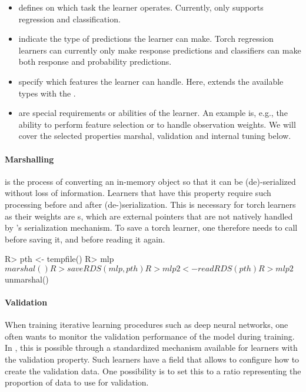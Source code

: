 \documentclass[article]{jss}
\theoremstyle{definition}
\begin{document}
\begin{itemize}
    \item {} defines on which task the learner operates. Currently,  only supports regression and classification.
    \item {} indicate the type of predictions the learner can make. Torch regression learners can currently only make response predictions and classifiers can make both response and probability predictions.
    \item {} specify which features the learner can handle. Here, \mlrttorch{} extends the available types with the .
    \item {} are special requirements or abilities of the learner. An example is, e.g., the ability to perform feature selection or to handle observation weights. We will cover the selected properties marshal, validation and internal tuning below.
\end{itemize}


\paragraph{Marshalling} is the process of converting an in-memory object so that it can be (de)-serialized without loss of information.
Learners that have this property require such processing before and after (de-)serialization.
This is necessary for torch learners as their weights are s, which are external pointers that are not natively handled by \rlang{}'s serialization mechanism.
To save a torch learner, one therefore needs to call  before saving it, and  before reading it again.

\begin{CodeInput}
R> pth <- tempfile()
R> mlp$marshal()
R> saveRDS(mlp, pth)
R> mlp2 <- readRDS(pth)
R> mlp2$unmarshal()
\end{CodeInput}

\paragraph{Validation}

When training iterative learning procedures such as deep neural networks, one often wants to monitor the validation performance of the model during training.
In , this is possible through a standardized mechanism available for learners with the validation property.
Such learners have a  field that allows to configure how to create the validation data.
One possibility is to set this to a ratio representing the proportion of data to use for validation.
\end{document}

